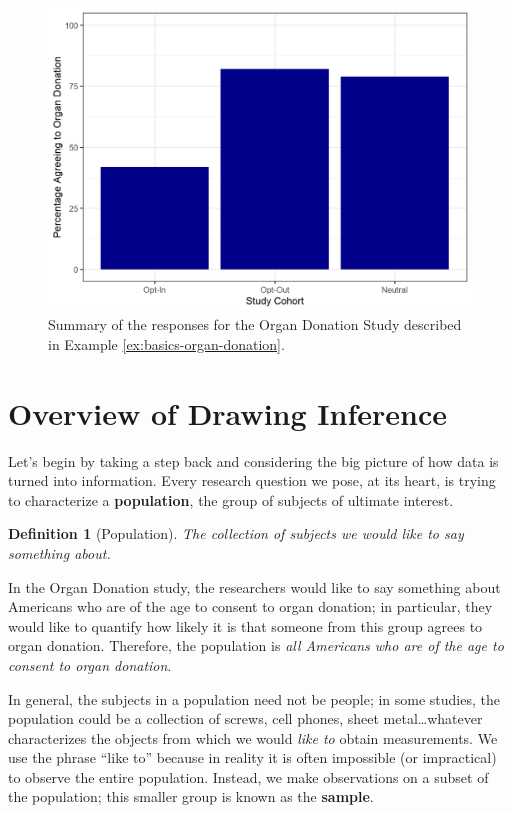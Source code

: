 \documentclass[
]{book}
\theoremstyle{plain}
\theoremstyle{mydefn}
\newtheorem{definition}{Definition}[chapter]
\theoremstyle{myexmpl}
\theoremstyle{remark}
\begin{document}
\begin{figure}

{\centering \includegraphics[width=0.8\linewidth]{./Images/basics-organ-plot-1} 

}

\caption{Summary of the responses for the Organ Donation Study described in Example \ref{ex:basics-organ-donation}.}\label{fig:basics-organ-plot}
\end{figure}

\hypertarget{overview-of-drawing-inference}{%
\section{Overview of Drawing Inference}\label{overview-of-drawing-inference}}

Let's begin by taking a step back and considering the big picture of how data is turned into information. Every research question we pose, at its heart, is trying to characterize a \textbf{population}, the group of subjects of ultimate interest.

\begin{definition}[Population]
\protect\hypertarget{def:defn-population}{}{\label{def:defn-population} {} }The collection of subjects we would like to say something about.
\end{definition}

In the Organ Donation study, the researchers would like to say something about Americans who are of the age to consent to organ donation; in particular, they would like to quantify how likely it is that someone from this group agrees to organ donation. Therefore, the population is \emph{all Americans who are of the age to consent to organ donation}.

In general, the subjects in a population need not be people; in some studies, the population could be a collection of screws, cell phones, sheet metal\ldots whatever characterizes the objects from which we would \emph{like to} obtain measurements. We use the phrase ``like to'' because in reality it is often impossible (or impractical) to observe the entire population. Instead, we make observations on a subset of the population; this smaller group is known as the \textbf{sample}.
\end{document}
